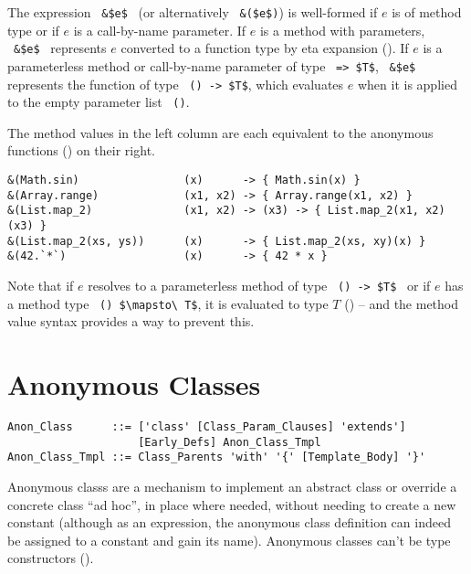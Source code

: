 The expression ~\lstinline!&$e$!~ (or alternatively ~\lstinline!&($e$)!) is well-formed if $e$ is of method type or if $e$ is a call-by-name parameter. If $e$ is a method with parameters, ~\lstinline!&$e$!~ represents $e$ converted to a function type by eta expansion (). If $e$ is a parameterless method or call-by-name parameter of type ~\lstinline!=> $T$!, ~\lstinline!&$e$!~ represents the function of type ~\lstinline!() -> $T$!, which evaluates $e$ when it is applied to the empty parameter list ~\lstinline!()!. 

\example The method values in the left column are each equivalent to the anonymous functions () on their right. 
\begin{lstlisting}[deletekeywords={range}]
&(Math.sin)                (x)      -> { Math.sin(x) }
&(Array.range)             (x1, x2) -> { Array.range(x1, x2) }
&(List.map_2)              (x1, x2) -> (x3) -> { List.map_2(x1, x2)(x3) }
&(List.map_2(xs, ys))      (x)      -> { List.map_2(xs, xy)(x) }
&(42.`*`)                  (x)      -> { 42 * x }
\end{lstlisting}

Note that if $e$ resolves to a parameterless method of type ~\lstinline!() -> $T$!~ or if $e$ has a method type ~\lstinline!() $\mapsto\ T$!, it is evaluated to type $T$ () -- and the method value syntax provides a way to prevent this. 





\section{Anonymous Classes}
\label{sec:anonymous-classes}

\syntax\begin{lstlisting}
Anon_Class      ::= ['class' [Class_Param_Clauses] 'extends'] 
                    [Early_Defs] Anon_Class_Tmpl
Anon_Class_Tmpl ::= Class_Parents 'with' '{' [Template_Body] '}'
\end{lstlisting}

Anonymous classs are a mechanism to implement an abstract class or override a concrete class ``ad hoc'', in place where needed, without needing to create a new constant (although as an expression, the anonymous class definition can indeed be assigned to a constant and gain its name). Anonymous classes can't be type constructors (). 

